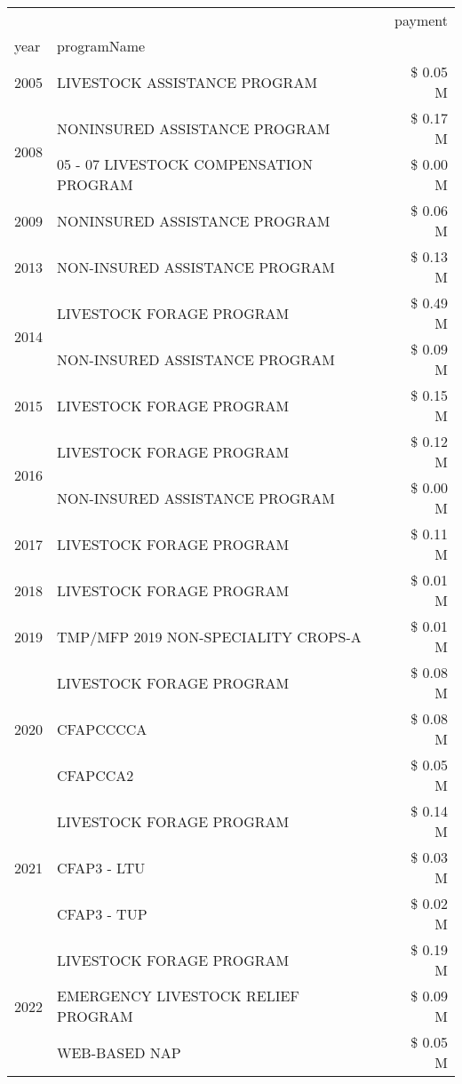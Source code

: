 \begin{tabular}{llr}
\toprule
 &  & payment \\
year & programName &  \\
\midrule
2005 & LIVESTOCK ASSISTANCE PROGRAM & \$ 0.05 M \\
\cline{1-3}
\multirow[t]{2}{*}{2008} & NONINSURED ASSISTANCE PROGRAM & \$ 0.17 M \\
 & 05 - 07 LIVESTOCK COMPENSATION PROGRAM & \$ 0.00 M \\
\cline{1-3}
2009 & NONINSURED ASSISTANCE PROGRAM & \$ 0.06 M \\
\cline{1-3}
2013 & NON-INSURED ASSISTANCE PROGRAM & \$ 0.13 M \\
\cline{1-3}
\multirow[t]{2}{*}{2014} & LIVESTOCK FORAGE PROGRAM & \$ 0.49 M \\
 & NON-INSURED ASSISTANCE PROGRAM & \$ 0.09 M \\
\cline{1-3}
2015 & LIVESTOCK FORAGE PROGRAM & \$ 0.15 M \\
\cline{1-3}
\multirow[t]{2}{*}{2016} & LIVESTOCK FORAGE PROGRAM & \$ 0.12 M \\
 & NON-INSURED ASSISTANCE PROGRAM & \$ 0.00 M \\
\cline{1-3}
2017 & LIVESTOCK FORAGE PROGRAM & \$ 0.11 M \\
\cline{1-3}
2018 & LIVESTOCK FORAGE PROGRAM & \$ 0.01 M \\
\cline{1-3}
2019 & TMP/MFP 2019 NON-SPECIALITY CROPS-A & \$ 0.01 M \\
\cline{1-3}
\multirow[t]{3}{*}{2020} & LIVESTOCK FORAGE PROGRAM & \$ 0.08 M \\
 & CFAPCCCCA & \$ 0.08 M \\
 & CFAPCCA2 & \$ 0.05 M \\
\cline{1-3}
\multirow[t]{3}{*}{2021} & LIVESTOCK FORAGE PROGRAM & \$ 0.14 M \\
 & CFAP3 - LTU & \$ 0.03 M \\
 & CFAP3 - TUP & \$ 0.02 M \\
\cline{1-3}
\multirow[t]{3}{*}{2022} & LIVESTOCK FORAGE PROGRAM & \$ 0.19 M \\
 & EMERGENCY LIVESTOCK RELIEF PROGRAM & \$ 0.09 M \\
 & WEB-BASED NAP & \$ 0.05 M \\
\cline{1-3}
\bottomrule
\end{tabular}
